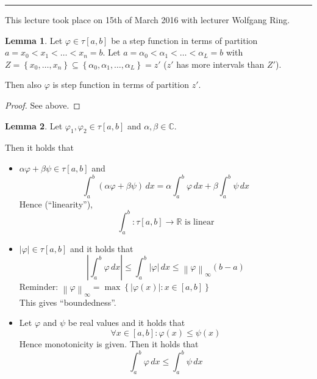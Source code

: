 \documentclass[a4paper,landscape,twocolumn]{article}
\theoremstyle{definition}
\newtheorem{lemma}{Lemma}
\newcommand\set[1]{\left\{#1\right\}}
\newcommand\abs[1]{\left|#1\right|}
\newcommand\meta[3]{\hrule{} This #1 took place on #2 with lecturer #3.\par}
\newcommand\norm[1]{\left\|#1\right\|}
\begin{document}
\meta{lecture}{15th of March 2016}{Wolfgang Ring}

\begin{lemma}
  Let $\varphi \in \tau[a,b]$ be a step function in terms of partition
  $a = x_0 < x_1 < \ldots < x_n = b$.
  Let $a = \alpha_0 < \alpha_1 < \ldots < \alpha_L = b$ with
  $Z = \set{x_0, \ldots, x_n} \subseteq \set{\alpha_0, \alpha_1, \ldots, \alpha_L} = z'$
  ($z'$ has more intervals than $Z'$).

  Then also $\varphi$ is step function in terms of partition $z'$.
\end{lemma}

\begin{proof}
  See above.
\end{proof}

\begin{lemma}
  Let $\varphi_1, \varphi_2 \in \tau[a,b]$ and $\alpha, \beta \in \mathbb C$.

  Then it holds that
  \begin{itemize}
    \item $\alpha \varphi + \beta \psi \in \tau[a,b]$ and
      \[ \int_a^b (\alpha \varphi + \beta \psi) \, dx = \alpha \int_a^b \varphi \, dx + \beta \int_a^b \psi \, dx \]
      Hence (\enquote{linearity}),
      \[ \int_a^b: \tau[a,b] \to \mathbb R \text{ is linear} \]
    \item $\abs{\varphi} \in \tau[a,b]$ and it holds that
      \[ \abs{\int_a^b \varphi \, dx} \leq \int_a^b \abs{\varphi} \, dx \leq \norm{\varphi}_\infty (b-a) \]
      Reminder: $\norm{\varphi}_\infty = \max\set{\abs{\varphi(x)}: x \in [a,b]}$ \\
      This gives \enquote{boundedness}.
    \item Let $\varphi$ and $\psi$ be real values and it holds that
      \[ \forall x \in [a,b]: \varphi(x) \leq \psi(x) \]
      Hence monotonicity is given.
      Then it holds that
      \[ \int_a^b \varphi \, dx \leq \int_a^b \psi \, dx \]
  \end{itemize}
\end{lemma}
\end{document}
